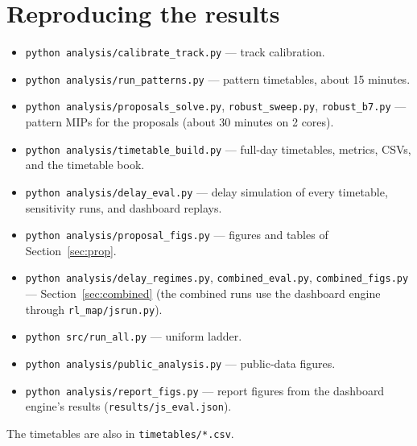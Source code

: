 \documentclass[11pt]{article}
\begin{document}
\section{Reproducing the results}
\begin{itemize}
\item \texttt{python analysis/calibrate\_track.py} --- track calibration.
\item \texttt{python analysis/run\_patterns.py} --- pattern timetables, about 15 minutes.
\item \texttt{python analysis/proposals\_solve.py}, \texttt{robust\_sweep.py}, \texttt{robust\_b7.py} --- pattern MIPs for the proposals (about 30 minutes on 2 cores).
\item \texttt{python analysis/timetable\_build.py} --- full-day timetables, metrics, CSVs, and the timetable book.
\item \texttt{python analysis/delay\_eval.py} --- delay simulation of every timetable, sensitivity runs, and dashboard replays.
\item \texttt{python analysis/proposal\_figs.py} --- figures and tables of Section~\ref{sec:prop}.
\item \texttt{python analysis/delay\_regimes.py}, \texttt{combined\_eval.py}, \texttt{combined\_figs.py} --- Section~\ref{sec:combined} (the combined runs use the dashboard engine through \texttt{rl\_map/jsrun.py}).
\item \texttt{python src/run\_all.py} --- uniform ladder.
\item \texttt{python analysis/public\_analysis.py} --- public-data figures.
\item \texttt{python analysis/report\_figs.py} --- report figures from the dashboard engine's results (\texttt{results/js\_eval.json}).
\end{itemize}
The timetables are also in \texttt{timetables/*.csv}.
\end{document}
